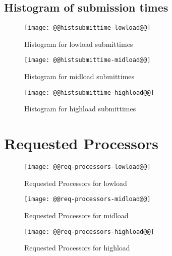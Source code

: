 \documentclass[11pt]{article}
\begin{document}
\subsection{Histogram of submission times}
\begin{figure}[htbp]
  \begin{center}
    \texttt{[image: @@histsubmittime-lowload@@]}
    \caption{Histogram for lowload submittimes}
    \label{fig:histsubmittime-lowload}
  \end{center}
\end{figure}
\begin{figure}[htbp]
  \begin{center}
    \texttt{[image: @@histsubmittime-midload@@]}
    \caption{Histogram for midload submittimes}
    \label{fig:histsubmittime-midload}
  \end{center}
\end{figure}
\begin{figure}[htbp]
  \begin{center}
    \texttt{[image: @@histsubmittime-highload@@]}
    \caption{Histogram for highload submittimes}
    \label{fig:histsubmittime-highload}
  \end{center}
\end{figure}

\newpage
\section{Requested Processors}
\begin{figure}[htbp]
  \begin{center}
    \texttt{[image: @@req-processors-lowload@@]}
    \caption{Requested Processors for lowload}
    \label{fig:req-processors-lowload}
  \end{center}
\end{figure}
\begin{figure}[htbp]
  \begin{center}
    \texttt{[image: @@req-processors-midload@@]}
    \caption{Requested Processors for midload}
    \label{fig:req-processors-midload}
  \end{center}
\end{figure}
\begin{figure}[htbp]
  \begin{center}
    \texttt{[image: @@req-processors-highload@@]}
    \caption{Requested Processors for highload}
    \label{fig:req-processors-highload}
  \end{center}
\end{figure}
\end{document}

